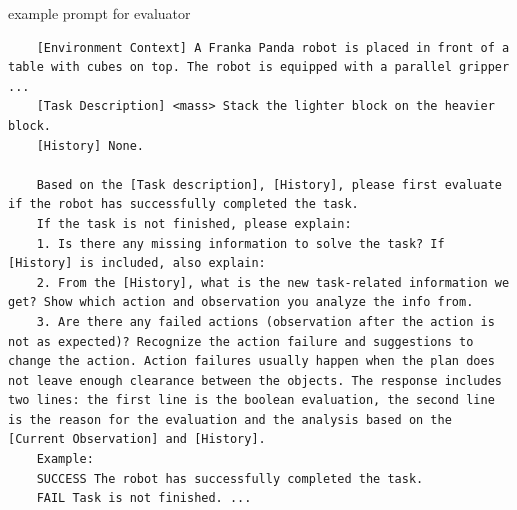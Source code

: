 \documentclass{article}
\begin{document}
example prompt for evaluator
\begin{verbatim}
	[Environment Context] A Franka Panda robot is placed in front of a table with cubes on top. The robot is equipped with a parallel gripper ...
	[Task Description] <mass> Stack the lighter block on the heavier block. 
	[History] None.
	
	Based on the [Task description], [History], please first evaluate if the robot has successfully completed the task. 
	If the task is not finished, please explain: 
	1. Is there any missing information to solve the task? If [History] is included, also explain:
	2. From the [History], what is the new task-related information we get? Show which action and observation you analyze the info from. 
	3. Are there any failed actions (observation after the action is not as expected)? Recognize the action failure and suggestions to change the action. Action failures usually happen when the plan does not leave enough clearance between the objects. The response includes two lines: the first line is the boolean evaluation, the second line is the reason for the evaluation and the analysis based on the [Current Observation] and [History]. 
	Example: 
	SUCCESS The robot has successfully completed the task. 
	FAIL Task is not finished. ...
\end{verbatim}
\end{document}
